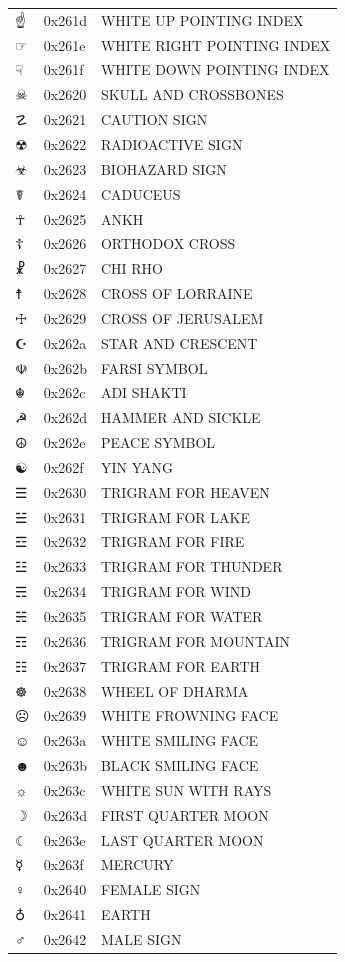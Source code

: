 \documentclass[12pt, twoside]{article}
\begin{document}
\begin{longtable}{L{1.0cm} L{2.0cm} >{\footnotesize}L{10cm}}
$☝$&0x261d&WHITE UP POINTING INDEX\\
$☞$&0x261e&WHITE RIGHT POINTING INDEX\\
$☟$&0x261f&WHITE DOWN POINTING INDEX\\
$☠$&0x2620&SKULL AND CROSSBONES\\
$☡$&0x2621&CAUTION SIGN\\
$☢$&0x2622&RADIOACTIVE SIGN\\
$☣$&0x2623&BIOHAZARD SIGN\\
$☤$&0x2624&CADUCEUS\\
$☥$&0x2625&ANKH\\
$☦$&0x2626&ORTHODOX CROSS\\
$☧$&0x2627&CHI RHO\\
$☨$&0x2628&CROSS OF LORRAINE\\
$☩$&0x2629&CROSS OF JERUSALEM\\
$☪$&0x262a&STAR AND CRESCENT\\
$☫$&0x262b&FARSI SYMBOL\\
$☬$&0x262c&ADI SHAKTI\\
$☭$&0x262d&HAMMER AND SICKLE\\
$☮$&0x262e&PEACE SYMBOL\\
$☯$&0x262f&YIN YANG\\
$☰$&0x2630&TRIGRAM FOR HEAVEN\\
$☱$&0x2631&TRIGRAM FOR LAKE\\
$☲$&0x2632&TRIGRAM FOR FIRE\\
$☳$&0x2633&TRIGRAM FOR THUNDER\\
$☴$&0x2634&TRIGRAM FOR WIND\\
$☵$&0x2635&TRIGRAM FOR WATER\\
$☶$&0x2636&TRIGRAM FOR MOUNTAIN\\
$☷$&0x2637&TRIGRAM FOR EARTH\\
$☸$&0x2638&WHEEL OF DHARMA\\
$☹$&0x2639&WHITE FROWNING FACE\\
$☺$&0x263a&WHITE SMILING FACE\\
$☻$&0x263b&BLACK SMILING FACE\\
$☼$&0x263c&WHITE SUN WITH RAYS\\
$☽$&0x263d&FIRST QUARTER MOON\\
$☾$&0x263e&LAST QUARTER MOON\\
$☿$&0x263f&MERCURY\\
$♀$&0x2640&FEMALE SIGN\\
$♁$&0x2641&EARTH\\
$♂$&0x2642&MALE SIGN\\

\end{longtable}
\end{document}
